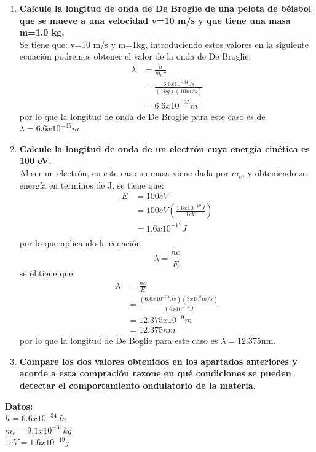 \documentclass[12pt,letterpaper]{report}
\begin{document}
\begin{enumerate}
    \item \textbf{Calcule la longitud de onda de De Broglie de una pelota de béisbol que se mueve a una velocidad v=10 m/s y que tiene una masa m=1.0 kg.}\\
    Se tiene que: v=10 m/s y m=1kg, introduciendo estos valores en la siguiente ecuación podremos obtener el valor de la onda de De Broglie.\\
    \begin{align*}
        \lambda &= \frac{h}{m_0 v}\\ 
                &= \frac{6.6x10^{-34} Js}{(1 kg)(10 m/s)} \\
                &= 6.6x10^{-35} m 
    \end{align*}
    por lo que la longitud de onda de De Broglie para este caso es de $\lambda = 6.6x10^{-35}m $
    \item \textbf{Calcule la longitud de onda de un electrón cuya energía cinética es 100 eV.}\\
    Al ser un electrón, en este caso su masa viene dada por $m_e$, y obteniendo su energía en terminos de J, se tiene que:
    \begin{align*}
        E   &= 100eV \\
            &= 100eV \left(\frac{1.6x10^{-19}J}{1eV} \right) \\
            &= 1.6x10^{-17}J\\
    \end{align*}
    por lo que aplicando la ecuación
    \begin{equation*}
        \lambda = \frac{hc}{E}
    \end{equation*}
    se obtiene que 
    \begin{align*}
        \lambda &= \frac{hc}{E} \\
                &= \frac{(6.6x10^{-34}Js)(3x10^8 m/s)}{1.6x10^{-17}J }\\
                & =12.375x 10^{-9} m \\
                &= 12.375 nm
    \end{align*}
    por lo que la longitud de De Boglie para este caso es $\lambda= 12.375$nm.
    \item \textbf{Compare los dos valores obtenidos en los apartados anteriores y acorde a esta compración razone en qué condiciones se pueden detectar el comportamiento ondulatorio de la materia.}
\end{enumerate}
\textbf{Datos:}\\
$h=6.6x10^{-34}Js$\\
$m_e=9.1x10^{-31}kg$\\
$1 eV=1.6x10^{-19}j$
\end{document}
